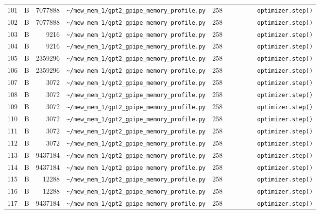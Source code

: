 \documentclass{article}
\begin{document}
\begin{longtable}{r l r p{6.5cm} r p{7.0cm}}
101 & B & 7077888 & \lstinline|~/mew_mem_1/gpt2_gpipe_memory_profile.py| & 258 & \lstinline|        optimizer.step()| \\
102 & B & 7077888 & \lstinline|~/mew_mem_1/gpt2_gpipe_memory_profile.py| & 258 & \lstinline|        optimizer.step()| \\
103 & B & 9216 & \lstinline|~/mew_mem_1/gpt2_gpipe_memory_profile.py| & 258 & \lstinline|        optimizer.step()| \\
104 & B & 9216 & \lstinline|~/mew_mem_1/gpt2_gpipe_memory_profile.py| & 258 & \lstinline|        optimizer.step()| \\
105 & B & 2359296 & \lstinline|~/mew_mem_1/gpt2_gpipe_memory_profile.py| & 258 & \lstinline|        optimizer.step()| \\
106 & B & 2359296 & \lstinline|~/mew_mem_1/gpt2_gpipe_memory_profile.py| & 258 & \lstinline|        optimizer.step()| \\
107 & B & 3072 & \lstinline|~/mew_mem_1/gpt2_gpipe_memory_profile.py| & 258 & \lstinline|        optimizer.step()| \\
108 & B & 3072 & \lstinline|~/mew_mem_1/gpt2_gpipe_memory_profile.py| & 258 & \lstinline|        optimizer.step()| \\
109 & B & 3072 & \lstinline|~/mew_mem_1/gpt2_gpipe_memory_profile.py| & 258 & \lstinline|        optimizer.step()| \\
110 & B & 3072 & \lstinline|~/mew_mem_1/gpt2_gpipe_memory_profile.py| & 258 & \lstinline|        optimizer.step()| \\
111 & B & 3072 & \lstinline|~/mew_mem_1/gpt2_gpipe_memory_profile.py| & 258 & \lstinline|        optimizer.step()| \\
112 & B & 3072 & \lstinline|~/mew_mem_1/gpt2_gpipe_memory_profile.py| & 258 & \lstinline|        optimizer.step()| \\
113 & B & 9437184 & \lstinline|~/mew_mem_1/gpt2_gpipe_memory_profile.py| & 258 & \lstinline|        optimizer.step()| \\
114 & B & 9437184 & \lstinline|~/mew_mem_1/gpt2_gpipe_memory_profile.py| & 258 & \lstinline|        optimizer.step()| \\
115 & B & 12288 & \lstinline|~/mew_mem_1/gpt2_gpipe_memory_profile.py| & 258 & \lstinline|        optimizer.step()| \\
116 & B & 12288 & \lstinline|~/mew_mem_1/gpt2_gpipe_memory_profile.py| & 258 & \lstinline|        optimizer.step()| \\
117 & B & 9437184 & \lstinline|~/mew_mem_1/gpt2_gpipe_memory_profile.py| & 258 & \lstinline|        optimizer.step()| \\

\end{longtable}
\end{document}
